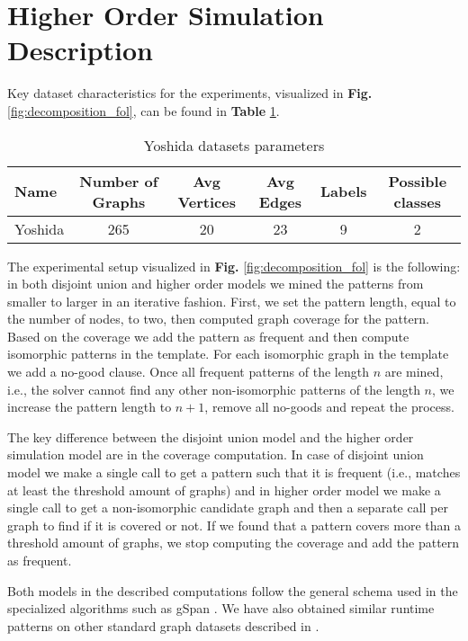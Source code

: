 \newpage
\appendix
\section{Higher Order Simulation Description}
\label{sec:hol_description}
Key dataset characteristics for the experiments, visualized in \textbf{Fig.} \ref{fig:decomposition_fol}, can be found in \textbf{Table} \ref{table:yoshida}.
\begin{table}[thb]
  \caption{Yoshida datasets parameters}
  \label{table:yoshida}
  \begin{tabular}{l c c c c c}
    Name & Number of Graphs & Avg Vertices & Avg Edges & Labels & Possible classes\\
    \hline
    Yoshida & 265 & 20 &  23 &  9 & 2
  \end{tabular}
\end{table}

The experimental setup visualized in \textbf{Fig.} \ref{fig:decomposition_fol} is the following: in both disjoint union and higher order models we mined the patterns from smaller to larger in an iterative fashion. First, we set the pattern length, equal to the number of nodes, to two, then computed graph coverage for the pattern. Based on the coverage we add the pattern as frequent and then compute isomorphic patterns in the template. For each isomorphic graph in the template we add a no-good clause. Once all frequent patterns of the length $n$ are mined, i.e., the solver cannot find any other non-isomorphic patterns of the length $n$, we increase the pattern length to $n+1$, remove all no-goods and repeat the process.

The key difference between the disjoint union model and the higher order simulation model are in the coverage computation. In case of disjoint union model we make a single call to get a pattern such that it is frequent (i.e., matches at least the threshold amount of graphs) and in higher order model we make a single call to get a non-isomorphic candidate graph and then a separate call per graph to find if it is covered or not. If we found that a pattern covers more than a threshold amount of graphs, we stop computing the coverage and add the pattern as frequent.

Both models in the described computations follow the general schema used in the specialized algorithms such as gSpan \cite{gspan}. We have also obtained similar runtime patterns on other standard graph datasets described in \cite{ilp_graph_mining}.


